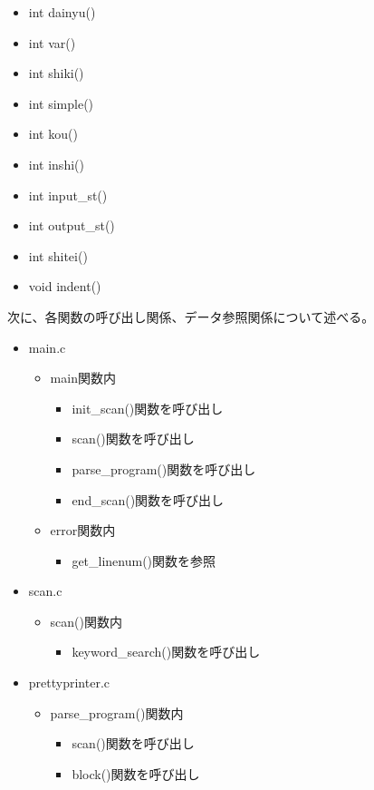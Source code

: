 \documentclass{jarticle}
\begin{document}
\begin{itemize}
\begin{itemize}
    \item int dainyu()
    \item int var()
    \item int shiki()
    \item int simple()
    \item int kou()
    \item int inshi()
    \item int input\_st()
    \item int output\_st()
    \item int shitei()
    \item void indent()
  \end{itemize}
\end{itemize}

次に、各関数の呼び出し関係、データ参照関係について述べる。
\begin{itemize}
  \item main.c
  \begin{itemize}
    \item main関数内
    \begin{itemize}
      \item init\_scan()関数を呼び出し
      \item scan()関数を呼び出し
      \item parse\_program()関数を呼び出し
      \item end\_scan()関数を呼び出し
    \end{itemize}
    \item error関数内
    \begin{itemize}
      \item get\_linenum()関数を参照
    \end{itemize}
  \end{itemize}
  \item scan.c
  \begin{itemize}
    \item scan()関数内
    \begin{itemize}
      \item keyword\_search()関数を呼び出し
    \end{itemize}
  \end{itemize}
  \item prettyprinter.c
  \begin{itemize}
    \item parse\_program()関数内
    \begin{itemize}
      \item scan()関数を呼び出し
      \item block()関数を呼び出し

\end{itemize}
\end{itemize}
\end{itemize}
\end{document}
